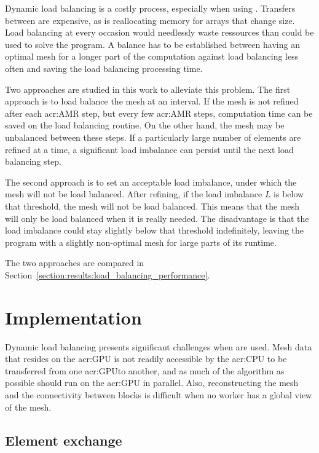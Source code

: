 Dynamic load balancing is a costly process, especially when using . Transfers
between  are expensive, as is reallocating memory for arrays that change size.
Load balancing at every occasion would needlessly waste ressources than could be used to solve the
program. A balance has to be established between having an optimal mesh for a longer part of the
computation against load balancing less often and saving the load balancing processing time.

Two approaches are studied in this work to alleviate this problem. The first approach is to load
balance the mesh at an interval. If the mesh is not refined after each \acrshort{acr:AMR} step, but
every few \acrshort{acr:AMR} steps, computation time can be saved on the load balancing routine. On
the other hand, the mesh may be unbalanced between these steps. If a particularly large number of
elements are refined at a time, a significant load imbalance can persist until the next load
balancing step.

The second approach is to set an acceptable load imbalance, under which the mesh will not be load
balanced. After refining, if the load imbalance \(L\) is below that threshold, the mesh will not be
load balanced. This means that the mesh will only be load balanced when it is really needed. The
disadvantage is that the load imbalance could stay slightly below that threshold indefinitely,
leaving the program with a slightly non-optimal mesh for large parts of its runtime.

The two approaches are compared in Section~\ref{section:results:load_balancing_performance}.

\section{Implementation}\label{section:load_balancing:implementation}

Dynamic load balancing presents significant challenges when  are used. Mesh data
that resides on the \acrshort{acr:GPU} is not readily accessible by the \acrshort{acr:CPU} to be
transferred from one \acrshort{acr:GPU}to another, and as much of the algorithm as possible should
run on the \acrshort{acr:GPU} in parallel. Also, reconstructing the mesh and the connectivity
between blocks is difficult when no worker has a global view of the mesh. 

\subsection{Element exchange}\label{subsection:load_balancing:implementation:element_exchange}

